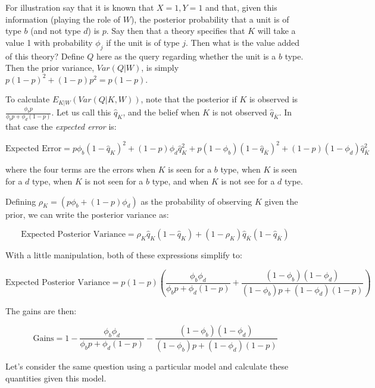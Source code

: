 \documentclass[12pt,]{book}
\begin{document}
For illustration say that it is known that \(X=1, Y=1\) and that, given this information (playing the role of \(W\)), the posterior probability that a unit is of type \(b\) (and not type \(d\)) is \(p\). Say then that a theory specifies that \(K\) will take a value 1 with probability \(\phi_j\) if the unit is of type \(j\). Then what is the value added of this theory? Define \(Q\) here as the query regarding whether the unit is a \(b\) type. Then the prior variance, \(Var(Q|W)\), is simply \(p(1-p)^2 +(1-p)p^2 = p(1-p)\).

To calculate \(E_{K|W}(Var(Q|K,W))\), note that the posterior if \(K\) is observed is \(\frac{\phi_bp}{\phi_bp+\phi_d(1-p)}\). Let us call this \(\hat{q}_K\), and the belief when \(K\) is not observed \(\hat{q}_{\overline{K}}\).
In that case the \emph{expected error} is:

\[\text{Expected Error} = p\phi_b\left(1-\hat{q}_K\right)^2+(1-p)\phi_d\hat{q}_K^2+p(1-\phi_b)\left(1-\hat{q}_{\overline{K}}\right)^2+(1-p)(1-\phi_d)\hat{q}_{\overline{K}}^2\]

where the four terms are the errors when \(K\) is seen for a \(b\) type, when \(K\) is seen for a \(d\) type, when \(K\) is not seen for a \(b\) type, and when \(K\) is not see for a \(d\) type.

Defining \(\rho_K = (p\phi_b+(1-p)\phi_d)\) as the probability of observing \(K\) given the prior, we can write the posterior variance as:

\[\text{Expected Posterior Variance} = \rho_K\hat{q}_K(1-\hat{q}_K)+(1-\rho_K)\hat{q}_{\overline{K}}(1-\hat{q}_{\overline{K}})\]

With a little manipulation, both of these expressions simplify to:

\[\text{Expected Posterior Variance} =p(1-p)\left(\frac{\phi_b\phi_d}{\phi_bp+\phi_d(1-p)} + \frac{(1-\phi_b)(1-\phi_d)}{(1-\phi_b)p+(1-\phi_d)(1-p)}\right)\]

The gains are then:

\[\text{Gains} =1- \frac{\phi_b\phi_d}{\phi_bp+\phi_d(1-p)} - \frac{(1-\phi_b)(1-\phi_d)}{(1-\phi_b)p+(1-\phi_d)(1-p)}\]

Let's consider the same question using a particular model and calculate these quantities given this model.
\end{document}
